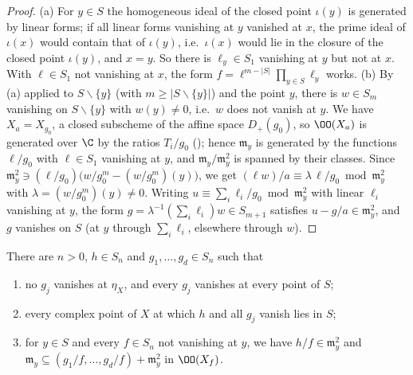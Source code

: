 \begin{proof}
(a) For $y\in S$ the homogeneous ideal of the closed point $\iota(y)$ is generated by linear forms; if all linear forms vanishing at $y$
vanished at $x$, the prime ideal of $\iota(x)$ would contain that of $\iota(y)$, i.e.\ $\iota(x)$ would lie in the closure of the closed point
$\iota(y)$, and $x=y$. So there is $\ell_y\in S_1$ vanishing at $y$ but not at $x$. With $\ell\in S_1$ not vanishing at $x$, the form
$f=\ell^{m-|S|}\prod_{y\in S}\ell_y$ works.
(b) By (a) applied to $S\smallsetminus\{y\}$ (with $m\ge|S\smallsetminus\{y\}|$) and the point $y$, there is $w\in S_m$ vanishing on
$S\smallsetminus\{y\}$ with $w(y)\ne0$, i.e.\ $w$ does not vanish at $y$. We have $X_a=X_{g_0}$, a closed subscheme of the affine space
$D_+(g_0)$, so $\OO(X_a)$ is generated over $\C$ by the ratios $T_i/g_0$ (); hence
$\mathfrak m_y$ is generated by the functions $\ell/g_0$ with $\ell\in S_1$ vanishing at $y$, and $\mathfrak m_y/\mathfrak m_y^2$ is spanned by
their classes. Since $\mathfrak m_y^2\ni(\ell/g_0)\bigl(w/g_0^m-(w/g_0^m)(y)\bigr)$, we get $(\ell w)/a\equiv\lambda\,\ell/g_0\bmod\mathfrak m_y^2$
with $\lambda=(w/g_0^m)(y)\ne0$. Writing $u\equiv\sum_i\ell_i/g_0\bmod\mathfrak m_y^2$ with linear $\ell_i$ vanishing at $y$, the form
$g=\lambda^{-1}(\sum_i\ell_i)w\in S_{m+1}$ satisfies $u-g/a\in\mathfrak m_y^2$, and $g$ vanishes on $S$ (at $y$ through $\sum_i\ell_i$, elsewhere
through $w$).
\end{proof}

\begin{proposition}\label{pf:hlf-cech:jets}
There are $n>0$, $h\in S_n$ and $g_1,\dots,g_d\in S_n$ such that
\begin{enumerate}[label=(\alph*),nosep]
\item no $g_j$ vanishes at $\eta_X$, and every $g_j$ vanishes at every point of $S$;
\item every complex point of $X$ at which $h$ and all $g_j$ vanish lies in $S$;
\item for $y\in S$ and every $f\in S_n$ not vanishing at $y$, we have $h/f\in\mathfrak m_y^2$ and $\mathfrak m_y\subseteq(g_1/f,\dots,g_d/f)+\mathfrak m_y^2$
  in $\OO(X_f)$.
\end{enumerate}
\end{proposition}

